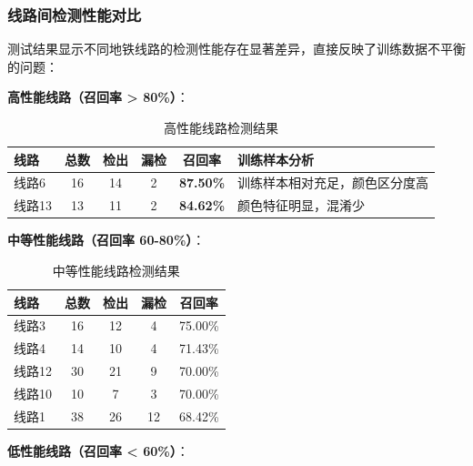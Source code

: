 \documentclass[12pt,a4paper]{article}
\begin{document}
\subsubsection{线路间检测性能对比}

测试结果显示不同地铁线路的检测性能存在显著差异，直接反映了训练数据不平衡的问题：

\textbf{高性能线路（召回率 > 80\%）}：

\begin{table}[H]
    \centering
    \begin{tabular}{|l|c|c|c|c|l|}
        \hline
        \textbf{线路} & \textbf{总数} & \textbf{检出} & \textbf{漏检} & \textbf{召回率} & \textbf{训练样本分析} \\
        \hline
        线路6 & 16 & 14 & 2 & \textbf{87.50\%} & 训练样本相对充足，颜色区分度高 \\
        线路13 & 13 & 11 & 2 & \textbf{84.62\%} & 颜色特征明显，混淆少 \\
        \hline
    \end{tabular}
    \caption{高性能线路检测结果}
    \label{tab:high_performance_lines}
\end{table}

\textbf{中等性能线路（召回率 60-80\%）}：

\begin{table}[H]
    \centering
    \begin{tabular}{|l|c|c|c|c|}
        \hline
        \textbf{线路} & \textbf{总数} & \textbf{检出} & \textbf{漏检} & \textbf{召回率} \\
        \hline
        线路3 & 16 & 12 & 4 & 75.00\% \\
        线路4 & 14 & 10 & 4 & 71.43\% \\
        线路12 & 30 & 21 & 9 & 70.00\% \\
        线路10 & 10 & 7 & 3 & 70.00\% \\
        线路1 & 38 & 26 & 12 & 68.42\% \\
        \hline
    \end{tabular}
    \caption{中等性能线路检测结果}
    \label{tab:medium_performance_lines}
\end{table}

\textbf{低性能线路（召回率 < 60\%）}：
\end{document}
